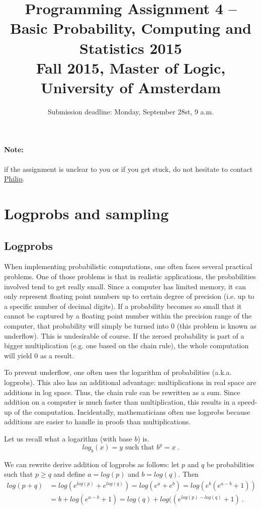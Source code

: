 \documentclass[11pt, leqno, a4paper]{article}
\title{Programming Assignment 4 -- Basic Probability, Computing and Statistics 2015 \\[2mm]
\large{Fall 2015, Master of Logic, University of Amsterdam}}
\author{}
\date{Submission deadline: Monday, September 28st, 9 a.m.}
\begin{document}
\maketitle

\paragraph{Note:} if the assignment is unclear to you or if you get stuck, do not hesitate to contact \href{mailto:P.Schulz@uva.nl}{Philip}.

\section{Logprobs and sampling}

\subsection{Logprobs}
When implementing probabilistic computations, one often faces several practical problems. One of those 
problems is that in realistic applications, the probabilities involved tend to get really small. Since
a computer has limited memory, it can only represent floating point numbers up to certain degree of precision
(i.e. up to a specific number of decimal digits). If a probability becomes so small that it cannot
be captured by a floating point number within the precision range of the computer, that probability will
simply be turned into 0 (this problem is known as underflow). 
This is undesirable of course. If the zeroed probability is part of a bigger 
multiplication (e.g. one based on the chain rule), the whole computation will yield 0 as a result. 

To prevent underflow, one often uses the logarithm of probabilities (a.k.a. logprobs). This also has an
additional advantage: multiplications in real space are additions in log space. Thus, the chain rule
can be rewritten as a sum. Since addition on a computer is much faster than multiplication, this results
in a speed-up of the computation. Incidentally, mathematicians often use logprobs because additions
are easier to handle in proofs than multiplications.

Let us recall what a logarithm (with base $ b $) is.
\begin{equation}
log_{b}(x) = y \mbox{ such that } b^{y} = x \ .
\end{equation}

We can rewrite derive addition of logprobs as follows: let $ p $ and $ q $ be probabilities such that
$ p \geq q $ and define $ a = log(p) $ and $ b = log(q) $. Then
\begin{align}
log(p + q) &= log \left( e^{log(p)} + e^{log(q)} \right) = log \left( e^{a} + e^{b} \right)
= log \left(e^{b} ( e^{a-b} + 1) \right) \\ 
&= b + log \left( e^{a-b} + 1 \right) 
=log(q) + log (\left( e^{log(p)-log(q)} + 1 \right) \nonumber \ .
\end{align}
\end{document}
